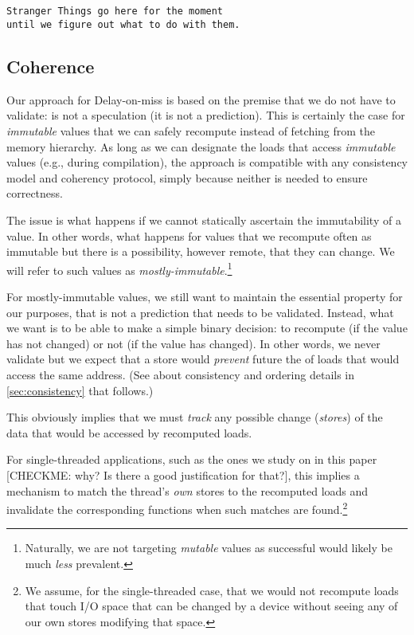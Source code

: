 \begin{verbatim}


Stranger Things go here for the moment 
until we figure out what to do with them.

 \end{verbatim}


\subsection{Coherence}
Our {\recomp} approach for Delay-on-miss is based on the premise that we do not have to validate: {\recomp} is not a speculation (it is not a prediction). This is certainly the case for \emph{immutable} values that we can safely recompute instead of fetching from the memory hierarchy. As long as we can designate the loads that access \emph{immutable} values (e.g., during compilation), the approach is compatible with any consistency model and coherency protocol, simply because neither is needed to ensure correctness.

The issue is what happens if we cannot statically ascertain the immutability of a value. In other words, what happens for values that we recompute often as immutable but there is a possibility, however remote, that they can change. We will refer to such values as \emph{mostly-immutable}.\footnote{Naturally, we are not targeting \emph{mutable} values as successful {\recomp} would likely be much \emph{less} prevalent.}

For mostly-immutable values, we still want to maintain the essential property for our purposes, that {\recomp} is not a prediction that needs to be validated. Instead, what we want is to be able to make a simple binary decision: to recompute (if the value has not changed) or not (if the value has changed). In other words, we never validate {\recomp} but we expect that a store would \emph{prevent} future the {\recomp} of loads that would access the same address. (See about consistency and ordering details in \autoref{sec:consistency} that follows.)

This obviously implies that we must \emph{track} any possible change (\emph{stores}) of the data that would be accessed by recomputed loads.

For single-threaded applications, {\color{blue} such as the ones we study on in this paper} {\color{red} [CHECKME: why? Is there a good justification for that?]}, this implies a mechanism to match the thread's \emph{own} stores to the recomputed loads and invalidate the corresponding {\recomp} functions when such matches are found.\footnote{We assume, for the single-threaded case, that we would not recompute loads that touch I/O space that can be changed by a device without seeing any of our own stores modifying that space.}

